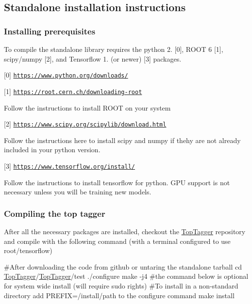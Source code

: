 \subsection*{Standalone installation instructions}

\subsubsection*{Installing prerequisites}

To compile the standalone library requires the python 2. \mbox{[}0\mbox{]}, R\-O\-O\-T 6 \mbox{[}1\mbox{]}, scipy/numpy \mbox{[}2\mbox{]}, and Tensorflow 1. (or newer) \mbox{[}3\mbox{]} packages.

\mbox{[}0\mbox{]} \href{https://www.python.org/downloads/}{\tt https\-://www.\-python.\-org/downloads/}

\mbox{[}1\mbox{]} \href{https://root.cern.ch/downloading-root}{\tt https\-://root.\-cern.\-ch/downloading-\/root}

Follow the instructions to install R\-O\-O\-T on your system

\mbox{[}2\mbox{]} \href{https://www.scipy.org/scipylib/download.html}{\tt https\-://www.\-scipy.\-org/scipylib/download.\-html}

Follow the instructions here to install scipy and numpy if thehy are not already included in your python version.

\mbox{[}3\mbox{]} \href{https://www.tensorflow.org/install/}{\tt https\-://www.\-tensorflow.\-org/install/}

Follow the instructions to install tensorflow for python. G\-P\-U support is not necessary unless you will be training new models.

\subsubsection*{Compiling the top tagger}

After all the necessary packages are installed, checkout the \hyperlink{classTopTagger}{Top\-Tagger} repository and compile with the following command (with a terminal configured to use root/tensorflow)


\begin{DoxyCode}
\textcolor{preprocessor}{#After downloading the code from github or untaring the standalone tarball }
\textcolor{preprocessor}{}cd \hyperlink{classTopTagger}{TopTagger}/\hyperlink{classTopTagger}{TopTagger}/test
./configure
make -j4
\textcolor{preprocessor}{#the command below is optional for system wide install (will require sudo rights)}
\textcolor{preprocessor}{}\textcolor{preprocessor}{#To install in a non-standard directory add PREFIX=/install/path to the configure command}
\textcolor{preprocessor}{make install}
\end{DoxyCode}


